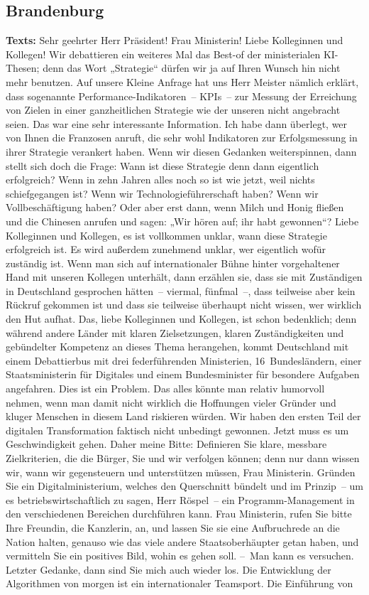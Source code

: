 \documentclass{article}
\begin{document}
\subsection{Brandenburg}
\noindent\textbf{Texts:} Sehr geehrter Herr Präsident! Frau Ministerin! Liebe Kolleginnen und Kollegen! Wir debattieren ein weiteres Mal das Best-of der ministerialen KI-Thesen; denn das Wort „Strategie“ dürfen wir ja auf Ihren Wunsch hin nicht mehr benutzen. Auf unsere Kleine Anfrage hat uns Herr Meister nämlich erklärt, dass sogenannte Performance-Indikatoren – KPIs – zur Messung der Erreichung von Zielen in einer ganzheitlichen Strategie wie der unseren nicht angebracht seien.  Das war eine sehr interessante Information. Ich habe dann überlegt, wer von Ihnen die Franzosen anruft, die sehr wohl Indikatoren zur Erfolgsmessung in ihrer Strategie verankert haben.  Wenn wir diesen Gedanken weiterspinnen, dann stellt sich doch die Frage: Wann ist diese Strategie denn dann eigentlich erfolgreich? Wenn in zehn Jahren alles noch so ist wie jetzt, weil nichts schiefgegangen ist? Wenn wir Technologieführerschaft haben? Wenn wir Vollbeschäftigung haben? Oder aber erst dann, wenn Milch und Honig fließen und die Chinesen anrufen und sagen: „Wir hören auf; ihr habt gewonnen“? Liebe Kolleginnen und Kollegen, es ist vollkommen unklar, wann diese Strategie erfolgreich ist. Es wird außerdem zunehmend unklar, wer eigentlich wofür zuständig ist.  Wenn man sich auf internationaler Bühne hinter vorgehaltener Hand mit unseren Kollegen unterhält, dann erzählen sie, dass sie mit Zuständigen in Deutschland gesprochen hätten – viermal, fünfmal –, dass teilweise aber kein Rückruf gekommen ist und dass sie teilweise überhaupt nicht wissen, wer wirklich den Hut aufhat. Das, liebe Kolleginnen und Kollegen, ist schon bedenklich; denn während andere Länder mit klaren Zielsetzungen, klaren Zuständigkeiten und gebündelter Kompetenz an dieses Thema herangehen, kommt Deutschland mit einem Debattierbus mit drei federführenden Ministerien, 16 Bundesländern, einer Staatsministerin für Digitales und einem Bundesminister für besondere Aufgaben angefahren. Dies ist ein Problem.  Das alles könnte man relativ humorvoll nehmen, wenn man damit nicht wirklich die Hoffnungen vieler Gründer und kluger Menschen in diesem Land riskieren würden. Wir haben den ersten Teil der digitalen Transformation faktisch nicht unbedingt gewonnen. Jetzt muss es um Geschwindigkeit gehen. Daher meine Bitte: Definieren Sie klare, messbare Zielkriterien, die die Bürger, Sie und wir verfolgen können; denn nur dann wissen wir, wann wir gegensteuern und unterstützen müssen, Frau Ministerin.  Gründen Sie ein Digitalministerium, welches den Querschnitt bündelt und im Prinzip – um es betriebswirtschaftlich zu sagen, Herr Röspel – ein Programm-Management in den verschiedenen Bereichen durchführen kann. Frau Ministerin, rufen Sie bitte Ihre Freundin, die Kanzlerin, an, und lassen Sie sie eine Aufbruchrede an die Nation halten, genauso wie das viele andere Staatsoberhäupter getan haben,  und vermitteln Sie ein positives Bild, wohin es gehen soll.  – Man kann es versuchen. Letzter Gedanke, dann sind Sie mich auch wieder los. Die Entwicklung der Algorithmen von morgen ist ein internationaler Teamsport. Die Einführung von 
\end{document}
